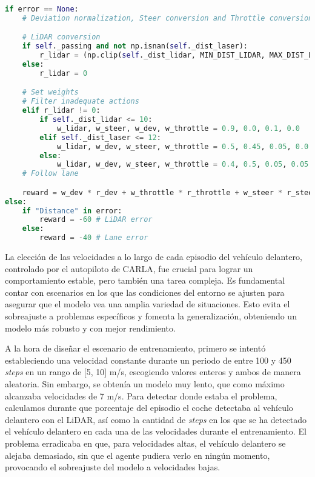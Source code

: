 \begin{code}[H]
\begin{lstlisting}[language=Python]
if error == None:
    # Deviation normalization, Steer conversion and Throttle conversion

    # LiDAR conversion
    if self._passing and not np.isnan(self._dist_laser):
        r_lidar = (np.clip(self._dist_lidar, MIN_DIST_LIDAR, MAX_DIST_LIDAR) - MIN_DIST_LIDAR) / (MAX_DIST_LIDAR - MIN_DIST_LIDAR)       
    else:
        r_lidar = 0

    # Set weights
    # Filter inadequate actions
    elif r_lidar != 0:
        if self._dist_lidar <= 10:
            w_lidar, w_steer, w_dev, w_throttle = 0.9, 0.0, 0.1, 0.0
        elif self._dist_laser <= 12:
            w_lidar, w_dev, w_steer, w_throttle = 0.5, 0.45, 0.05, 0.0
        else:
            w_lidar, w_dev, w_steer, w_throttle = 0.4, 0.5, 0.05, 0.05
    # Follow lane

    reward = w_dev * r_dev + w_throttle * r_throttle + w_steer * r_steer + w_lidar * r_lidar
else:
    if "Distance" in error:
        reward = -60 # LiDAR error
    else:
        reward = -40 # Lane error
\end{lstlisting}
\caption[Función de recompensa respecto al \ac{LiDAR} para control de crucero adaptativo basado \ac{PPO}]{Función de recompensa respecto al \ac{LiDAR} para control de crucero adaptativo basado \ac{PPO}.}
\label{cod:rew_ppo_passing}
\end{code}

La elección de las velocidades a lo largo de cada episodio del vehículo delantero, controlado por el autopiloto de CARLA, fue crucial para lograr un comportamiento estable, pero también una tarea compleja. Es fundamental contar con escenarios en los que las condiciones del entorno se ajusten para asegurar que el modelo vea una amplia variedad de situaciones. Esto evita el sobreajuste a problemas específicos y fomenta la generalización, obteniendo un modelo más robusto y con mejor rendimiento.

A la hora de diseñar el escenario de entrenamiento, primero se intentó estableciendo una velocidad constante durante un periodo de entre 100 y 450 \textit{steps} en un rango de [5, 10] m/s, escogiendo valores enteros y ambos de manera aleatoria. Sin embargo, se obtenía un modelo muy lento, que como máximo alcanzaba velocidades de 7 m/s. Para detectar donde estaba el problema, calculamos durante que porcentaje del episodio el coche detectaba al vehículo delantero con el \ac{LiDAR}, así como la cantidad de \textit{steps} en los que se ha detectado el vehículo delantero en cada una de las velocidades durante el entrenamiento. El problema erradicaba en que, para velocidades altas, el vehículo delantero se alejaba demasiado, sin que el agente pudiera verlo en ningún momento, provocando el sobreajuste del modelo a velocidades bajas.

